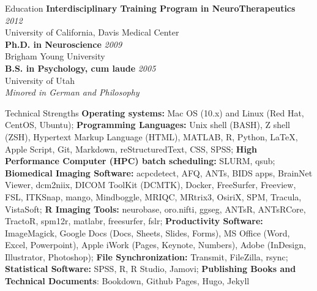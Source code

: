 \documentclass{resume} %
\begin{document}

\begin{rSection}{Education}
	{\bf Interdisciplinary Training Program in NeuroTherapeutics} \hfill {\em 2012}\\
	University of California, Davis Medical Center\\
	{\bf Ph.D. in Neuroscience} \hfill {\em 2009}\\
	Brigham Young University\\
	{\bf B.S. in Psychology, cum laude} \hfill {\em 2005}\\ 
	University of Utah\\ 
	\em{Minored in German and Philosophy}
\end{rSection}

\begin{rSection}{Technical Strengths}
\textbf{Operating systems:} Mac OS (10.x) and Linux (Red Hat, CentOS, Ubuntu); 
\textbf{Programming Languages:} Unix shell (BASH), Z shell (ZSH), Hypertext Markup Language (HTML), MATLAB, R, Python, LaTeX, Apple Script, Git, Markdown, reStructuredText, CSS, SPSS;
\textbf{High Performance Computer (HPC) batch scheduling:} SLURM, qsub;
\textbf{Biomedical Imaging Software:} acpcdetect, AFQ, ANTs, BIDS apps, BrainNet Viewer, dcm2niix, DICOM ToolKit (DCMTK), Docker, FreeSurfer, Freeview, FSL, ITKSnap, mango, Mindboggle, MRIQC, MRtrix3, OsiriX, SPM, Tracula, VistaSoft;
\textbf{R Imaging Tools:} neurobase, oro.nifti, ggseg, ANTsR, ANTsRCore, TractoR, spm12r, matlabr, freesurfer, fslr;
\textbf{Productivity Software:} ImageMagick, Google Docs (Docs, Sheets, Slides, Forms), MS Office (Word, Excel, Powerpoint), Apple iWork (Pages, Keynote, Numbers), Adobe (InDesign, Illustrator, Photoshop);
\textbf{File Synchronization:} Transmit, FileZilla, rsync;
\textbf{Statistical Software:} SPSS, R, R Studio, Jamovi;
\textbf{Publishing Books and Technical Documents}: Bookdown, Github Pages, Hugo, Jekyll
\end{rSection}
\end{document}
